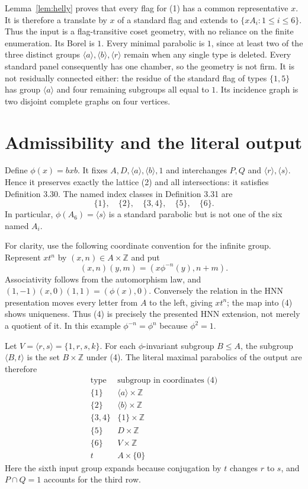 \documentclass[11pt,a4paper]{article}
\newcommand{\gen}[1]{\langle #1\rangle}
\begin{document}
Lemma~\ref{lem:helly} proves that every flag for (1) has a common
representative $x$. It is therefore a translate by $x$ of a standard
flag and extends to $\{xA_i:1\leq i\leq6\}$. Thus the input is a
flag-transitive coset geometry, with no reliance on the finite enumeration.
Its Borel is $1$. Every minimal parabolic is $1$, since at least two of
the three distinct groups $\gen a,\gen b,\gen r$ remain when any single
type is deleted. Every standard panel consequently has one chamber,
so the geometry is not firm. It is not residually connected either:
the residue of the standard flag of types $\{1,5\}$ has group $\gen a$
and four remaining subgroups all equal to $1$. Its incidence graph is
two disjoint complete graphs on four vertices.

\section{Admissibility and the literal output}
Define $\phi(x)=bxb$. It fixes $A,D,\gen a,\gen b,1$ and interchanges
$P,Q$ and $\gen r,\gen s$. Hence it preserves exactly the lattice (2)
and all intersections: it satisfies Definition 3.30. The named index
classes in Definition 3.31 are
\[
 \{1\},\quad\{2\},\quad\{3,4\},\quad\{5\},\quad\{6\}.    \tag{3}
\]
In particular, $\phi(A_6)=\gen s$ is a standard parabolic but is not
one of the six named $A_i$.

For clarity, use the following coordinate convention for the infinite
group. Represent $xt^n$ by $(x,n)\in A\times\mathbb Z$ and put
\[
 (x,n)(y,m)=(x\phi^{-n}(y),n+m).                         \tag{4}
\]
Associativity follows from the automorphism law, and
$(1,-1)(x,0)(1,1)=(\phi(x),0)$. Conversely the relation in the HNN
presentation moves every letter from $A$ to the left, giving $xt^n$;
the map into (4) shows uniqueness. Thus (4) is precisely the presented
HNN extension, not merely a quotient of it. In this example
$\phi^{-n}=\phi^n$ because $\phi^2=1$.

Let $V=\gen{r,s}=\{1,r,s,k\}$. For each $\phi$-invariant subgroup
$B\leq A$, the subgroup $\gen{B,t}$ is the set $B\times\mathbb Z$
under (4). The literal maximal parabolics of the output are therefore
\[
\begin{array}{c|c}
\text{type}&\text{subgroup in coordinates (4)}\\\hline
\{1\}&\gen a\times\mathbb Z\\
\{2\}&\gen b\times\mathbb Z\\
\{3,4\}&\{1\}\times\mathbb Z\\
\{5\}&D\times\mathbb Z\\
\{6\}&V\times\mathbb Z\\
t&A\times\{0\}
\end{array}                                                     \tag{5}
\]
Here the sixth input group expands because conjugation by $t$ changes
$r$ to $s$, and $P\cap Q=1$ accounts for the third row.
\end{document}
